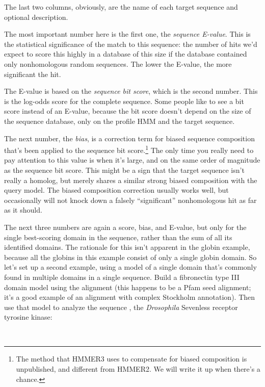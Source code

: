 The last two columns, obviously, are the name of each target sequence
and optional description.

The most important number here is the first one, the \emph{sequence
E-value}. This is the statistical significance of the match to this
sequence: the number of hits we'd expect to score this highly in a
database of this size if the database contained only nonhomologous
random sequences. The lower the E-value, the more significant the hit.

The E-value is based on the \emph{sequence bit score}, which is the
second number. This is the log-odds score for the complete sequence.
Some people like to see a bit score instead of an E-value, because the
bit score doesn't depend on the size of the sequence database, only on
the profile HMM and the target sequence.

The next number, the \emph{bias}, is a correction term for biased
sequence composition that's been applied to the sequence bit
score.\footnote{The method that HMMER3 uses to compensate for biased
composition is unpublished, and different from HMMER2. We will write
it up when there's a chance.} The only time you really need to pay
attention to this value is when it's large, and on the same order of
magnitude as the sequence bit score. This might be a sign that the
target sequence isn't really a homolog, but merely shares a similar
strong biased composition with the query model.  The biased
composition correction usually works well, but occasionally will not
knock down a falsely ``significant'' nonhomologous hit as far as it
should.

The next three numbers are again a score, bias, and E-value, but only
for the single best-scoring domain in the sequence, rather than the
sum of all its identified domains. The rationale for this isn't
apparent in the globin example, because all the globins in this
example consist of only a single globin domain. So let's set up a
second example, using a model of a single domain that's commonly found
in multiple domains in a single sequence. Build a fibronectin type III
domain model using the  alignment (this happens
to be a Pfam seed alignment; it's a good example of an alignment with
complex Stockholm annotation). Then use that model to analyze the
sequence , the \emph{Drosophila} Sevenless
receptor tyrosine kinase:

 \\

